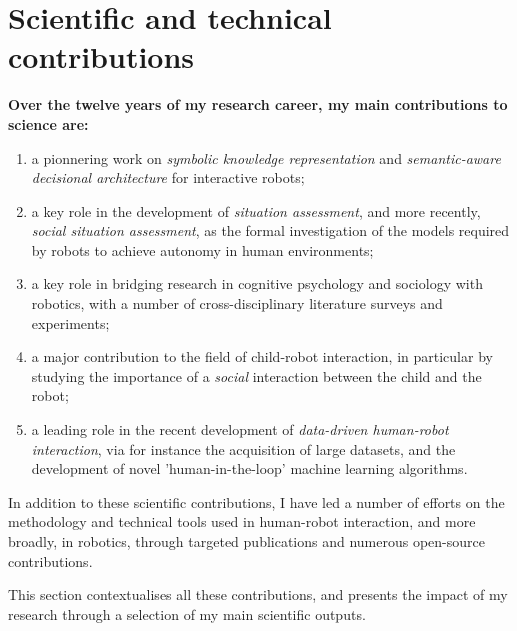 \vspace{2em}

\section{Scientific and technical contributions}
\label{sci-contribs}


\begin{framed}

    \vspace{1em}
\noindent\bf Over the twelve years of my research career, my main
contributions to science are:

    \vspace{2em}
\begin{enumerate}
    \item a pionnering work on \emph{symbolic knowledge representation} and
        \emph{semantic-aware decisional architecture} for interactive robots;

    \item a key role in the development of \emph{situation assessment}, and more
        recently, \emph{social situation assessment}, as the formal
        investigation of the models required by robots to achieve autonomy in
        human environments;

    \item a key role in bridging research in cognitive psychology and sociology with robotics,
        with a number of cross-disciplinary literature surveys and experiments;

    \item a major contribution to the field of child-robot interaction, in
        particular by studying the importance of a \emph{social} interaction between
        the child and the robot;

    \item a leading role in the recent development of \emph{data-driven
        human-robot interaction}, via for instance the acquisition of large
        datasets, and the development of novel 'human-in-the-loop' machine
        learning algorithms.

\end{enumerate}

    \vspace{2em}

\noindent In addition to these scientific contributions, I have led a number of
efforts on the methodology and technical tools used in human-robot
interaction, and more broadly, in robotics, through targeted publications
and numerous open-source contributions.

    \vspace{2em}
\noindent This section contextualises all these contributions, and presents the impact of my
research through a selection of my main scientific outputs.

    \vspace{1em}
\end{framed}


